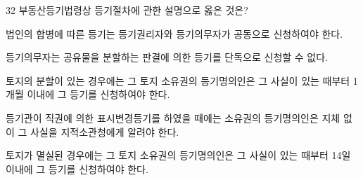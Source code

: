 \begin{question}{32}
부동산등기법령상 등기절차에 관한 설명으로 옳은 것은?
\begin{choices}
  \item 법인의 합병에 따른 등기는 등기권리자와 등기의무자가 공동으로 신청하여야 한다.
  \item 등기의무자는 공유물을 분할하는 판결에 의한 등기를 단독으로 신청할 수 없다.
  \item 토지의 분할이 있는 경우에는 그 토지 소유권의 등기명의인은 그 사실이 있는 때부터 1개월 이내에 그 등기를 신청하여야 한다.
  \item 등기관이 직권에 의한 표시변경등기를 하였을 때에는 소유권의 등기명의인은 지체 없이 그 사실을 지적소관청에게 알려야 한다.
  \item 토지가 멸실된 경우에는 그 토지 소유권의 등기명의인은 그 사실이 있는 때부터 14일 이내에 그 등기를 신청하여야 한다.
\end{choices}
\end{question}
